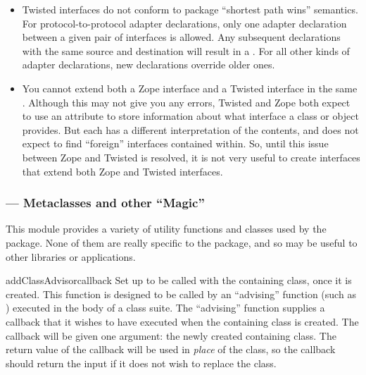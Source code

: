 \begin{verbatim%
}
\begin{verbatim%
}
\begin{verbatim%
}
\begin{verbatim%
}
\begin{verbatim%
}
\begin{verbatim%
}
\begin{itemize}
\item Twisted interfaces do not conform to  package ``shortest
path wins'' semantics.  For protocol-to-protocol adapter declarations, only one
adapter declaration between a given pair of interfaces is allowed.  Any
subsequent declarations with the same source and destination will result in
a .  For all other kinds of adapter declarations, new
declarations override older ones.

\item You cannot extend both a Zope interface and a Twisted interface in the
same .  Although this may not give you any errors,
Twisted and Zope both expect to use an  attribute to
store information about what interface a class or object provides.  But each has
a different interpretation of the contents, and does not expect to find
``foreign'' interfaces contained within.  So, until this issue between Zope and
Twisted is resolved, it is not very useful to create interfaces that extend
both Zope and Twisted interfaces.

\end{itemize}


















\newpage
\subsubsection{ --- Metaclasses and other ``Magic''}

This module provides a variety of utility functions and classes used by the
 package.  None of them are really specific to the
 package, and so may be useful to other libraries or
applications.

\begin{funcdesc}{addClassAdvisor}{callback }
Set up  to be called with the containing class, once it is
created.  This function is designed to be called by an ``advising'' function
(such as ) executed in the body of a class suite.
The ``advising'' function supplies a callback that it wishes to have executed
when the containing class is created.  The callback will be given one argument:
the newly created containing class.  The return value of the callback will be
used in \emph{place} of the class, so the callback should return the input if
it does not wish to replace the class.


\end{funcdesc}
\end{verbatim%
}
\end{verbatim%
}
\end{verbatim%
}
\end{verbatim%
}
\end{verbatim%
}
\end{verbatim%
}
